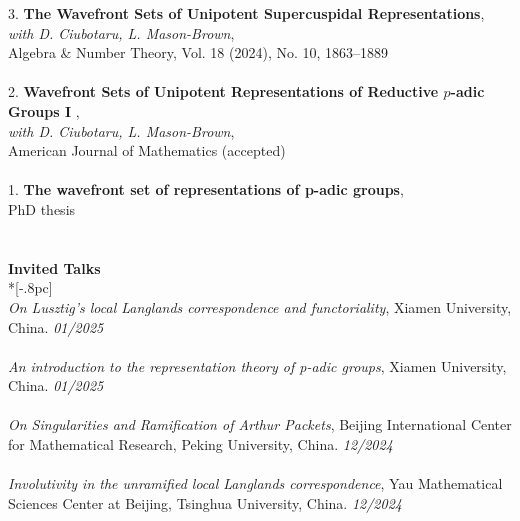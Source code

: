 \documentclass{article}
\begin{document}
3. \textbf{The Wavefront Sets of Unipotent Supercuspidal Representations}, \\%
\textit{with D. Ciubotaru, L. Mason-Brown}, \\
Algebra \& Number Theory, Vol. 18 (2024), No. 10, 1863–1889 \\
\\
2. \textbf{Wavefront Sets of Unipotent Representations of Reductive $p$-adic Groups I} , \\%
\textit{with D. Ciubotaru, L. Mason-Brown}, \\
American Journal of Mathematics (accepted) \\
\\
1. \textbf{The wavefront set of representations of p-adic groups}, \\%
PhD thesis \\
\\
\\
{\large \bf Invited Talks} \\*[-.8pc]
\underline{\hspace{1.2in}} 
\\
{\it 
On Lusztig’s local Langlands correspondence and functoriality}, Xiamen University, China. \hfill {\it 01/2025\/} \\
\\
{\it 
An introduction to the representation theory of p-adic groups}, Xiamen University, China. \hfill {\it 01/2025\/} \\
\\
{\it 
On Singularities and Ramification of Arthur Packets}, Beijing International Center for Mathematical Research, Peking University, China. \hfill {\it 12/2024\/} \\
\\
{\it 
Involutivity in the unramified local Langlands correspondence}, Yau Mathematical Sciences Center at Beijing, Tsinghua University, China. \hfill {\it 12/2024\/} \\
\\
\end{document}

